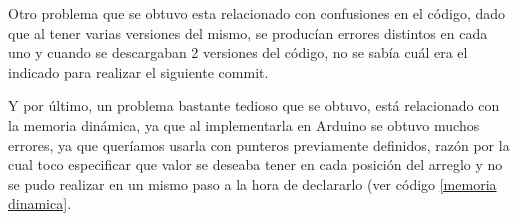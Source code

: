 \documentclass{article}
\begin{document}
Otro problema que se obtuvo esta relacionado con confusiones en el código, dado que al tener varias versiones del mismo, se producían errores distintos en cada uno y cuando se descargaban 2 versiones del código, no se sabía cuál era  el indicado para realizar el siguiente commit.

Y por último, un problema bastante tedioso que se obtuvo, está relacionado con la memoria dinámica, ya que al implementarla en Arduino se obtuvo muchos errores, ya que queríamos usarla con punteros previamente definidos, razón por la cual toco especificar  que valor se deseaba tener en cada posición del arreglo y no se pudo realizar en un mismo paso a la hora de declararlo (ver código \ref{memoria dinamica}.



\end{document}

